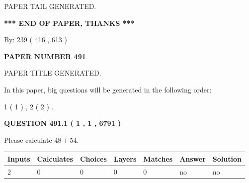 \documentclass[12pt]{article}
\begin{document}
   
   
\vspace{2.0in} PAPER TAIL GENERATED.
   
   
   
   
\vspace{1.0in} 
{\textbf{\large{ *** END OF PAPER, THANKS *** }}} 
   
   
\hspace{1.0in} By: 
 239 ( 416 ,  613 )
   
   
   
   
\newpage 
\setcounter{page}{ 
   491001 } 
   
   
   
   
 {\textbf{ \Large{ PAPER NUMBER  491  }}}
   
   
\vspace{0.2in}
   
   
   
   
   
   
   
   
 \vspace{0.2in}
 
 
 
 
   
   
 PAPER TITLE GENERATED.
   
   
   
\vspace{0.2in}
   
In this paper, big questions will be generated in the following order: 
   
   
   1 ( 1 )
 ,
   2 ( 2 )
 .
  
\vspace{0.2in}
  
{\textbf{\Large{QUESTION
491.1 
 ( 1 , 1 , 6791 )
}}}
  
  
 
Please calculate $ %
48 +  %
54 $.
 
 
   
   
   
   
\noindent\begin{tabular}{|l|l|l|l|l|l|l|}
 \hline
Inputs & Calculates & Choices & Layers & Matches & Answer & Solution \\ \hline
 2  & 
 0  & 
 0
  & 
 0  & 
 0  & 
  no & 
  no 
  \\ \hline
 \end{tabular}
   
\end{document}
